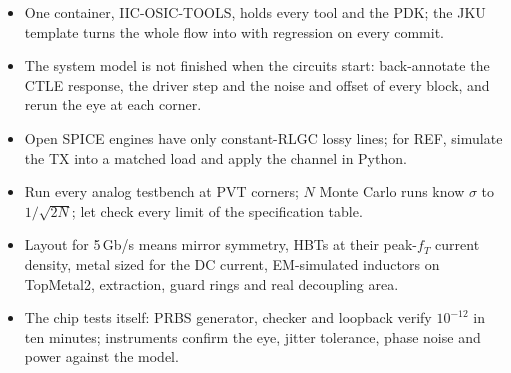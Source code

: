 \begin{takeaways}
\begin{itemize}
  \item One container, IIC-OSIC-TOOLS, holds every tool and the \sgx{} PDK; the JKU template turns the whole flow into  with regression on every commit.
  \item The system model is not finished when the circuits start: back-annotate the CTLE  response, the driver step and the noise and offset of every block, and rerun the eye at each corner.
  \item Open SPICE engines have only constant-RLGC lossy lines; for REF, simulate the TX into a matched load and apply the channel in Python.
  \item Run every analog testbench at PVT corners; $N$ Monte Carlo runs know $\sigma$ to $1/\sqrt{2N}$; let  check every limit of the specification table.
  \item Layout for 5\,Gb/s means mirror symmetry, HBTs at their peak-$f_T$ current density, metal sized for the DC current, EM-simulated inductors on TopMetal2, extraction, guard rings and real decoupling area.
  \item The chip tests itself: PRBS generator, checker and loopback verify $10^{-12}$ in ten minutes; instruments confirm the eye, jitter tolerance, phase noise and power against the model.
\end{itemize}
\end{takeaways}
